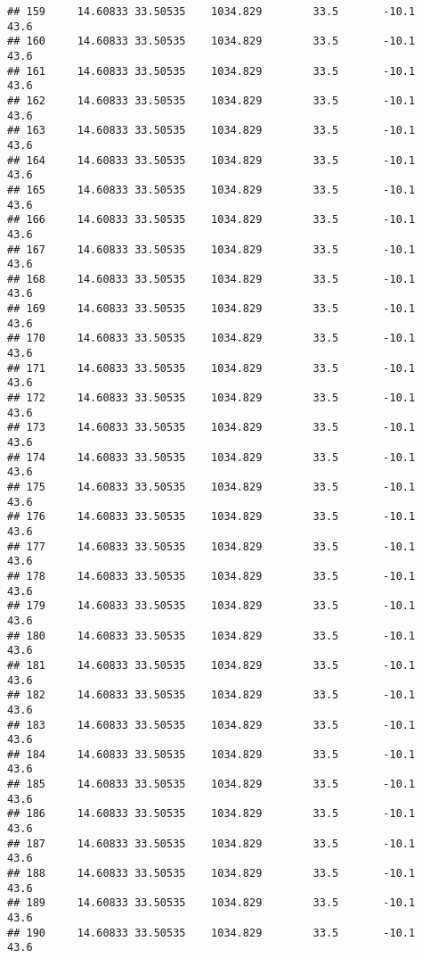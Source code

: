 \documentclass[]{article}
\begin{document}
\begin{verbatim}
## 159     14.60833 33.50535    1034.829        33.5       -10.1              43.6
## 160     14.60833 33.50535    1034.829        33.5       -10.1              43.6
## 161     14.60833 33.50535    1034.829        33.5       -10.1              43.6
## 162     14.60833 33.50535    1034.829        33.5       -10.1              43.6
## 163     14.60833 33.50535    1034.829        33.5       -10.1              43.6
## 164     14.60833 33.50535    1034.829        33.5       -10.1              43.6
## 165     14.60833 33.50535    1034.829        33.5       -10.1              43.6
## 166     14.60833 33.50535    1034.829        33.5       -10.1              43.6
## 167     14.60833 33.50535    1034.829        33.5       -10.1              43.6
## 168     14.60833 33.50535    1034.829        33.5       -10.1              43.6
## 169     14.60833 33.50535    1034.829        33.5       -10.1              43.6
## 170     14.60833 33.50535    1034.829        33.5       -10.1              43.6
## 171     14.60833 33.50535    1034.829        33.5       -10.1              43.6
## 172     14.60833 33.50535    1034.829        33.5       -10.1              43.6
## 173     14.60833 33.50535    1034.829        33.5       -10.1              43.6
## 174     14.60833 33.50535    1034.829        33.5       -10.1              43.6
## 175     14.60833 33.50535    1034.829        33.5       -10.1              43.6
## 176     14.60833 33.50535    1034.829        33.5       -10.1              43.6
## 177     14.60833 33.50535    1034.829        33.5       -10.1              43.6
## 178     14.60833 33.50535    1034.829        33.5       -10.1              43.6
## 179     14.60833 33.50535    1034.829        33.5       -10.1              43.6
## 180     14.60833 33.50535    1034.829        33.5       -10.1              43.6
## 181     14.60833 33.50535    1034.829        33.5       -10.1              43.6
## 182     14.60833 33.50535    1034.829        33.5       -10.1              43.6
## 183     14.60833 33.50535    1034.829        33.5       -10.1              43.6
## 184     14.60833 33.50535    1034.829        33.5       -10.1              43.6
## 185     14.60833 33.50535    1034.829        33.5       -10.1              43.6
## 186     14.60833 33.50535    1034.829        33.5       -10.1              43.6
## 187     14.60833 33.50535    1034.829        33.5       -10.1              43.6
## 188     14.60833 33.50535    1034.829        33.5       -10.1              43.6
## 189     14.60833 33.50535    1034.829        33.5       -10.1              43.6
## 190     14.60833 33.50535    1034.829        33.5       -10.1              43.6

\end{verbatim}
\end{document}
